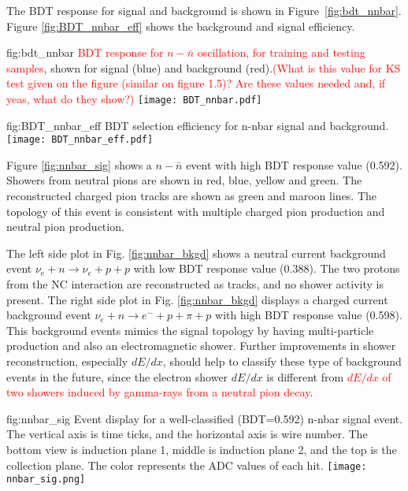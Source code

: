 The BDT response for signal and background is shown in Figure~\ref{fig:bdt_nnbar}. Figure \ref{fig:BDT_nnbar_eff} shows the background and signal efficiency. 

\begin{dunefigure}
{fig:bdt_nnbar}
{\textcolor{red}{BDT response for $n-\bar{n}$ oscillation, for training and testing samples}, shown for signal (blue) and background (red).\textcolor{red}{(What is this value for KS test given on the figure (similar on figure 1.5)? Are these values needed and, if yeas, what do they show?)}}
\texttt{[image: BDT\_nnbar.pdf]}
\end{dunefigure} 

\begin{dunefigure}
{fig:BDT_nnbar_eff}
{BDT selection efficiency for n-nbar signal and background.}
\texttt{[image: BDT\_nnbar\_eff.pdf]}
\end{dunefigure} 

Figure \ref{fig:nnbar_sig} shows a $n-\bar{n}$ event with high BDT response value (0.592). Showers from neutral pions are shown in red, blue, yellow and green. The reconstructed charged pion tracks are shown as green and maroon lines. The topology of this event is consistent with multiple charged pion production and neutral pion production. 

The left side plot in Fig. \ref{fig:nnbar_bkgd} shows a neutral current background event $\nu_{e}+n\rightarrow \nu_{e}+p+p$ with low BDT response value (0.388). The two protons from the NC interaction are reconstructed as tracks, and no shower activity is present. The right side plot in Fig. \ref{fig:nnbar_bkgd} displays a charged current background event $\nu_{e}+n\rightarrow {e}^{-}+p+\pi +p$ with high BDT response value (0.598). This background events mimics the signal topology by having multi-particle production and also an electromagnetic shower. Further improvements in shower reconstruction, especially $dE/dx$, should help to classify these type of background events in the future, since the electron shower $dE/dx$ is different from \textcolor{red}{$dE/dx$ of two showers induced by gamma-rays from a neutral pion decay}.

\begin{dunefigure}
{fig:nnbar_sig}
{Event display for a well-classified (BDT=0.592) n-nbar signal event.  The vertical axis is time ticks, and the horizontal axis is wire number.  The bottom view is induction plane 1, middle is induction plane 2, and the top is the collection plane.  The color represents the ADC values of each hit.}
\texttt{[image: nnbar\_sig.png]}
\end{dunefigure} 

